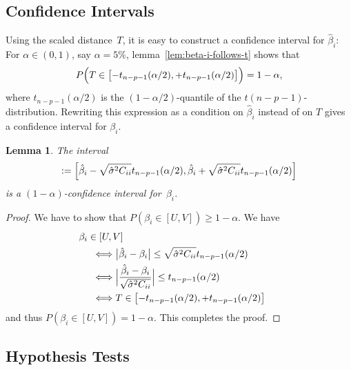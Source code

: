 \documentclass[
  a4paper,
]{article}
\newtheorem{lemma}{Lemma}[section]
\theoremstyle{definition}
\theoremstyle{definition}
\theoremstyle{definition}
\theoremstyle{definition}
\theoremstyle{remark}
\begin{document}
\subsection{Confidence Intervals}\label{confidence-intervals}

Using the scaled distance~\(T\), it is easy to construct a confidence
interval for \(\hat\beta_i\): For \(\alpha \in (0, 1)\), say \(\alpha = 5\%\),
lemma~\ref{lem:beta-i-follows-t} shows that
\begin{equation*}
  P\Bigl( T \in \bigl[-t_{n-p-1}(\alpha/2), +t_{n-p-1}(\alpha/2)\bigr] \Bigr)
  = 1 - \alpha,
\end{equation*}
where \(t_{n-p-1}(\alpha/2)\) is the \((1 - \alpha/2)\)-quantile of the
\(t(n-p-1)\)-distribution. Rewriting this expression as a condition on
\(\hat\beta_i\) instead of on \(T\) gives a confidence interval for \(\beta_i\).

\begin{lemma}
\protect\hypertarget{lem:single-CI}{}\label{lem:single-CI}The interval
\begin{equation*}
  [U, V]
  := \Bigl[ \hat\beta_i - \sqrt{\hat\sigma^2 C_{ii}}t_{n-p-1}(\alpha/2), \hat\beta_i + \sqrt{\hat\sigma^2 C_{ii}}t_{n-p-1}(\alpha/2) \Bigr]
\end{equation*}
is a \((1-\alpha)\)-confidence interval for~\(\beta_i\).
\end{lemma}

\begin{proof}
We have to show that \(P(\beta_i \in [U, V]) \geq 1-\alpha\). We have
\begin{align*}
  &\hskip-5mm \beta_i \in [U, V] \\
  &\Longleftrightarrow
    \bigl| \hat\beta_i - \beta_i \bigr|
        \leq \sqrt{\hat\sigma^2 C_{ii}}t_{n-p-1}(\alpha/2) \\
  &\Longleftrightarrow
    \Bigl| \frac{\hat\beta_i - \beta_i}{\sqrt{\hat\sigma^2 C_{ii}}} \Bigr|
        \leq t_{n-p-1}(\alpha/2) \\
  &\Longleftrightarrow
    T \in \bigl[-t_{n-p-1}(\alpha/2), +t_{n-p-1}(\alpha/2)\bigr]
\end{align*}
and thus \(P(\beta_i \in [U, V]) = 1 - \alpha\). This completes the proof.
\end{proof}

\subsection{Hypothesis Tests}\label{hypothesis-tests}
\end{document}
